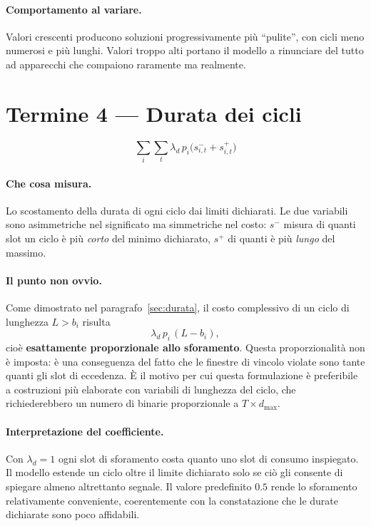 \paragraph{Comportamento al variare.} Valori crescenti producono soluzioni progressivamente più
``pulite'', con cicli meno numerosi e più lunghi. Valori troppo alti portano il modello a
rinunciare del tutto ad apparecchi che compaiono raramente ma realmente.

\section{Termine 4 --- Durata dei cicli}

\begin{equation}
  \sum_{i} \sum_{t} \lambda_d \, p_i \bigl( s^{-}_{i,t} + s^{+}_{i,t} \bigr)
\end{equation}

\paragraph{Che cosa misura.} Lo scostamento della durata di ogni ciclo dai limiti dichiarati. Le
due variabili sono asimmetriche nel significato ma simmetriche nel costo: $s^{-}$ misura di quanti
slot un ciclo è più \emph{corto} del minimo dichiarato, $s^{+}$ di quanti è più \emph{lungo} del
massimo.

\paragraph{Il punto non ovvio.} Come dimostrato nel paragrafo~\ref{sec:durata}, il costo complessivo di
un ciclo di lunghezza $L > b_i$ risulta
\begin{equation}
  \lambda_d \, p_i \, (L - b_i),
\end{equation}
cioè \textbf{esattamente proporzionale allo sforamento}. Questa proporzionalità non è imposta: è
una conseguenza del fatto che le finestre di vincolo violate sono tante quanti gli slot di
eccedenza. È il motivo per cui questa formulazione è preferibile a costruzioni più elaborate con
variabili di lunghezza del ciclo, che richiederebbero un numero di binarie proporzionale a
$T \times d_{\max}$.

\paragraph{Interpretazione del coefficiente.} Con $\lambda_d = 1$ ogni slot di sforamento costa
quanto uno slot di consumo inspiegato. Il modello estende un ciclo oltre il limite dichiarato solo
se ciò gli consente di spiegare almeno altrettanto segnale. Il valore predefinito $0.5$ rende lo
sforamento relativamente conveniente, coerentemente con la constatazione che le durate dichiarate
sono poco affidabili.

